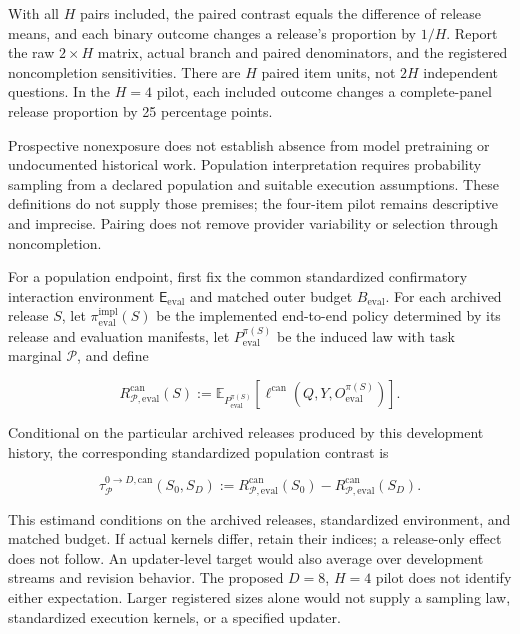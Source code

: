 \documentclass[10pt]{article} %
\providecommand{\1}{\mathbf{1}}  %
\theoremstyle{remark}
\theoremstyle{definition}
\begin{document}
With all $H$ pairs included, the paired contrast equals the difference
of release means, and each binary outcome changes a release's proportion
by $1/H$. Report the raw $2\times H$ matrix, actual branch and paired
denominators, and the registered noncompletion sensitivities. There are
$H$ paired item units, not $2H$ independent questions. In the $H=4$ pilot,
each included outcome changes a complete-panel release proportion by
25 percentage points.

Prospective nonexposure does not establish absence from model pretraining
or undocumented historical work. Population interpretation requires
probability sampling from a declared population and suitable execution
assumptions. These definitions do not supply those premises; the four-item
pilot remains descriptive and imprecise. Pairing does not remove provider
variability or selection through noncompletion.

For a population endpoint, first fix the common standardized confirmatory interaction environment $\mathsf E_{\mathrm{eval}}$ and matched outer budget $B_{\mathrm{eval}}$. For each archived release $S$, let $\pi_{\mathrm{eval}}^{\mathrm{impl}}(S)$ be the implemented end-to-end policy determined by its release and evaluation manifests, let $P_{\mathrm{eval}}^{\pi(S)}$ be the induced law with task marginal $\mathcal P$, and define

\begin{equation}
R_{\mathcal P,\mathrm{eval}}^{\mathrm{can}}(S)
:=
\mathbb E_{P_{\mathrm{eval}}^{\pi(S)}}\!\left[
\ell^{\mathrm{can}}\!\left(
Q,Y,O_{\mathrm{eval}}^{\pi(S)}
\right)
\right].
\end{equation}

Conditional on the particular archived releases produced by this development history, the corresponding standardized population contrast is

\begin{equation}
\tau_{\mathcal P}^{0\to D,\mathrm{can}}(S_0,S_D)
:=
R_{\mathcal P,\mathrm{eval}}^{\mathrm{can}}(S_0)
-
R_{\mathcal P,\mathrm{eval}}^{\mathrm{can}}(S_D).
\label{eq:conditional-terminal-population-contrast}
\end{equation}

This estimand conditions on the archived releases, standardized
environment, and matched budget. If actual kernels differ, retain their
indices; a release-only effect does not follow. An updater-level target
would also average over development streams and revision behavior.
The proposed $D=8$, $H=4$ pilot does not identify either expectation.
Larger registered sizes alone would not supply a sampling law, standardized
execution kernels, or a specified updater.
\end{document}
